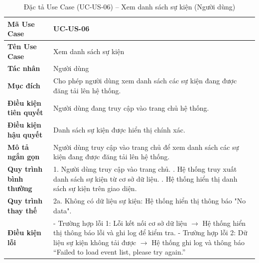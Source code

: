 \renewcommand{\arraystretch}{1.3}
\setlength{\tabcolsep}{4pt}
\begin{longtable}{|p{}|p{}|}
\caption{Đặc tả Use Case (UC-US-06) -- Xem danh sách sự kiện (Người dùng) }\label{tab:uc_view_event_list}\\
\hline
\textbf{Mã Use Case} & UC-US-06 \\ \hline
\textbf{Tên Use Case} & Xem danh sách sự kiện \\ \hline
\textbf{Tác nhân} & Người dùng \\ \hline
\textbf{Mục đích} & Cho phép người dùng xem danh sách các sự kiện đang được đăng tải lên hệ thống. \\ \hline
\textbf{Điều kiện tiên quyết} & Người dùng đang truy cập vào trang chủ hệ thống. \\ \hline
\textbf{Điều kiện hậu quyết} & Danh sách sự kiện được hiển thị chính xác. \\ \hline
\textbf{Mô tả ngắn gọn} & Người dùng truy cập vào trang chủ để xem danh sách các sự kiện đang được đăng tải lên hệ thống. \\ \hline
\textbf{Quy trình bình thường} &
1. Người dùng truy cập vào trang chủ. \newline
2. Hệ thống truy xuất danh sách sự kiện từ cơ sở dữ liệu. \newline
3. Hệ thống hiển thị danh sách sự kiện trên giao diện. \\ \hline
\textbf{Quy trình thay thế} &
2a. Không có dữ liệu sự kiện: Hệ thống hiển thị thông báo "No data". \\ \hline
\textbf{Điều kiện lỗi} &
- Trường hợp lỗi 1: Lỗi kết nối cơ sở dữ liệu $\rightarrow$ Hệ thống hiển thị thông báo lỗi và ghi log để kiểm tra. \newline
- Trường hợp lỗi 2: Dữ liệu sự kiện không tải được $\rightarrow$ Hệ thống ghi log và thông báo “Failed to load event list, please try again.” \\ \hline
\end{longtable}

